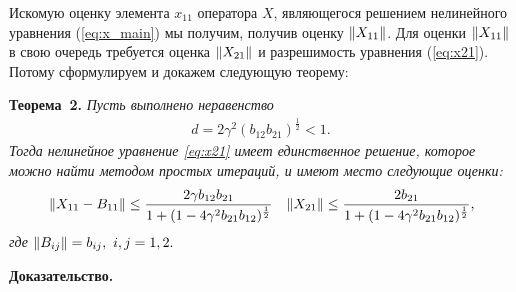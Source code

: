 
Искомую оценку элемента $x_{11}$ оператора $X$, являющегося решением нелинейного уравнения (\ref{eq:x_main}) мы получим, получив оценку $\left\|X_{11}\right\|$. Для оценки $\left\|X_{11}\right\|$ в свою очередь требуется оценка $\left\|X_{21}\right\|$ и разрешимость уравнения (\ref{eq:x21}). Потому сформулируем и докажем следующую теорему:

\noindent\textbf{Теорема~2.}
{ \it Пусть выполнено неравенство
\begin{align}
d = 2\gamma^2 (b_{12}b_{21})^{\frac{1}{2}} < 1. \label{coef}
\end{align}
Тогда нелинейное уравнение \eqref{eq:x21} имеет единственное решение, которое можно найти методом простых итераций, и имеют место следующие оценки:
\begin{align*}
&\left\|X_{11} - B_{11}\right\| \leq \frac{2\gamma b_{12}b_{21}}{1 + (1 - 4\gamma^2 b_{21}b_{12})^{\frac{1}{2}}}
&\left\|X_{21}\right\| \leq \frac{2b_{21}}{1 + (1 - 4\gamma^2 b_{21}b_{12})^{\frac{1}{2}}},
\end{align*}
где $\left\|B_{ij}\right\| = b_{ij},\ i,j = 1,2.$}

\noindent\textbf{Доказательство.}

